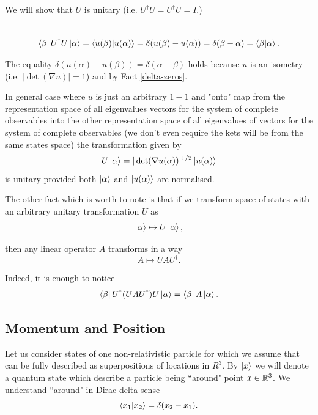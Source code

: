 \documentclass[main.tex]{subfiles}
\begin{document}
We will show that $U$ is unitary (i.e. $U^\dag U = U^\dag U = I$.)

\begin{multline*}
\\
\bra{\beta}U^\dag U \ket{\alpha} = \bra{u(\beta)}\ket{u(\alpha)} = \delta(u(\beta) - u(\alpha)) = 
\delta(\beta - \alpha) = \bra{\beta}\ket{\alpha}.\\
\end{multline*} 

The equality $\delta(u(\alpha) - u(\beta)) = \delta(\alpha - \beta)$ holds because $u$ is an isometry (i.e. $|\det (\nabla u)| = 1$) and by Fact \ref{delta-zeros}.

In general case where $u$ is just an arbitrary $1-1$ and "onto" map from the representation space of all eigenvalues vectors for the system of complete observables into the other representation space of all eigenvalues of vectors for the system of complete observables (we don't even require the kets will be from the same states space) the transformation given by
\begin{equation}
U \ket{\alpha} = |\det (\nabla u(\alpha))|^{1/2} \ket{u(\alpha)}
\end{equation} 
is unitary provided both $\ket{\alpha}$ and $\ket{u(\alpha)}$ are normalised.

The other fact which is worth to note is that if we transform space of states with an arbitrary unitary transformation $U$ as
\begin{equation}
\ket{\alpha} \mapsto U\ket{\alpha},
\end{equation} 

then any linear operator $A$ transforms in a way
\begin{equation}
A \mapsto UAU^\dag.
\end{equation}

Indeed, it is enough to notice
\begin{equation}
\bra{\beta}U^\dag(UAU^\dag)U \ket{\alpha} = \bra{\beta} A \ket{\alpha}.
\end{equation}



\subsection{Momentum and Position}
\label{momentum-position}

Let us consider states of one non-relativistic particle for which we assume that can be fully described as superpositions of locations in $R^3$. By $\ket{x}$ we will denote a quantum state which describe a particle being ``around" point $x\in \mathbb{R}^3$. We understand ``around" in Dirac delta sense
\begin{equation}
\bra{x_1}\ket{x_2} = \delta(x_2 - x_1).
\end{equation}
\end{document}
